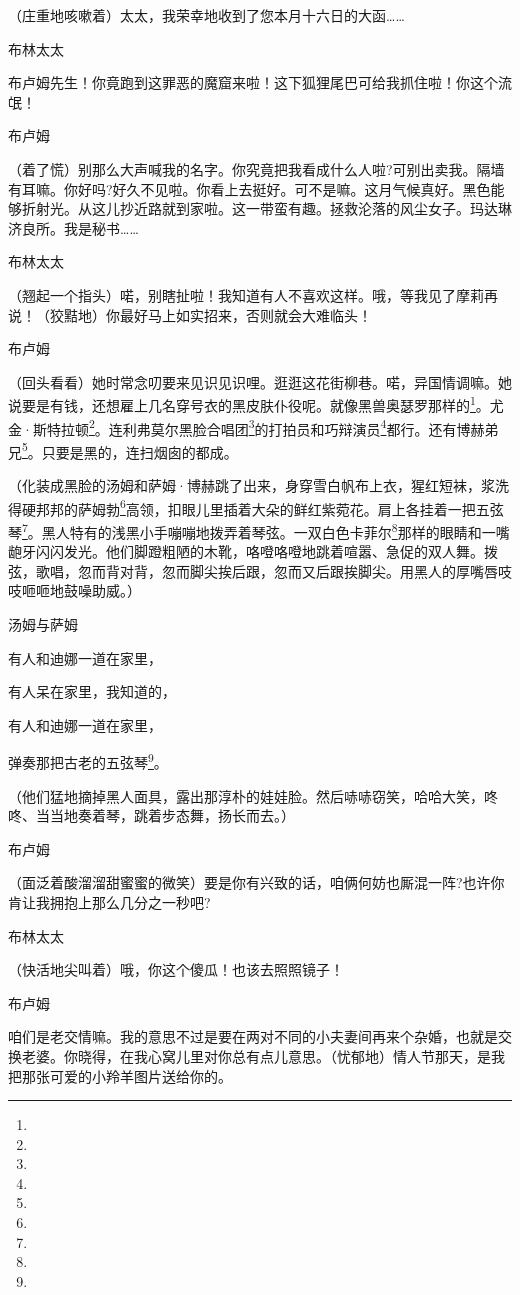 \par （庄重地咳嗽着）太太，我荣幸地收到了您本月十六日的大函……
\par 布林太太
\par 布卢姆先生！你竟跑到这罪恶的魔窟来啦！这下狐狸尾巴可给我抓住啦！你这个流氓！
\par 布卢姆
\par （着了慌）别那么大声喊我的名字。你究竟把我看成什么人啦?可别出卖我。隔墙有耳嘛。你好吗?好久不见啦。你看上去挺好。可不是嘛。这月气候真好。黑色能够折射光。从这儿抄近路就到家啦。这一带蛮有趣。拯救沦落的风尘女子。玛达琳济良所。我是秘书……
\par 布林太太
\par （翘起一个指头）喏，别瞎扯啦！我知道有人不喜欢这样。哦，等我见了摩莉再说！（狡黠地）你最好马上如实招来，否则就会大难临头！
\par 布卢姆
\par （回头看看）她时常念叨要来见识见识哩。逛逛这花街柳巷。喏，异国情调嘛。她说要是有钱，还想雇上几名穿号衣的黑皮肤仆役呢。就像黑兽奥瑟罗那样的\footnote{}。尤金·斯特拉顿\footnote{}。连利弗莫尔黑脸合唱团\footnote{}的打拍员和巧辩演员\footnote{}都行。还有博赫弟兄\footnote{}。只要是黑的，连扫烟囱的都成。
\par （化装成黑脸的汤姆和萨姆·博赫跳了出来，身穿雪白帆布上衣，猩红短袜，浆洗得硬邦邦的萨姆勃\footnote{}高领，扣眼儿里插着大朵的鲜红紫菀花。肩上各挂着一把五弦琴\footnote{}。黑人特有的浅黑小手嘣嘣地拨弄着琴弦。一双白色卡菲尔\footnote{}那样的眼睛和一嘴龅牙闪闪发光。他们脚蹬粗陋的木靴，咯噔咯噔地跳着喧嚣、急促的双人舞。拨弦，歌唱，忽而背对背，忽而脚尖挨后跟，忽而又后跟挨脚尖。用黑人的厚嘴唇吱吱咂咂地鼓噪助威。）
\par 汤姆与萨姆
\par 有人和迪娜一道在家里，
\par 有人呆在家里，我知道的，
\par 有人和迪娜一道在家里，
\par 弹奏那把古老的五弦琴\footnote{}。
\par （他们猛地摘掉黑人面具，露出那淳朴的娃娃脸。然后哧哧窃笑，哈哈大笑，咚咚、当当地奏着琴，跳着步态舞，扬长而去。）
\par 布卢姆
\par （面泛着酸溜溜甜蜜蜜的微笑）要是你有兴致的话，咱俩何妨也厮混一阵?也许你肯让我拥抱上那么几分之一秒吧?
\par 布林太太
\par （快活地尖叫着）哦，你这个傻瓜！也该去照照镜子！
\par 布卢姆
\par 咱们是老交情嘛。我的意思不过是要在两对不同的小夫妻间再来个杂婚，也就是交换老婆。你晓得，在我心窝儿里对你总有点儿意思。（忧郁地）情人节那天，是我把那张可爱的小羚羊图片送给你的。
